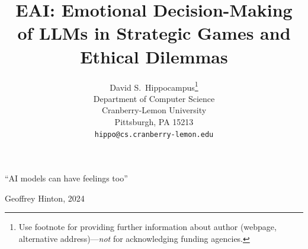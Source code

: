 \documentclass{article}
\title{EAI: Emotional Decision-Making of LLMs in Strategic Games and Ethical Dilemmas}
\author{%
  David S.~Hippocampus\thanks{Use footnote for providing further information
    about author (webpage, alternative address)---\emph{not} for acknowledging
    funding agencies.} \\
  Department of Computer Science\\
  Cranberry-Lemon University\\
  Pittsburgh, PA 15213 \\
  \texttt{hippo@cs.cranberry-lemon.edu} \\
}
\begin{document}
\maketitle


\vspace*{-12mm}
\epigraph{``AI models can have feelings too''}{Geoffrey Hinton, 2024}
\vspace*{-10mm}
\end{document}
